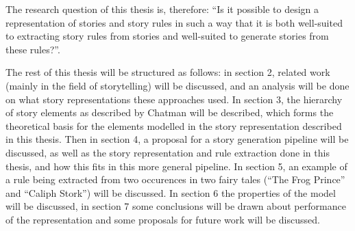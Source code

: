 The research question of this thesis is, therefore: ``Is it possible to design a
representation of stories and story rules in such a way that it is both 
well-suited to extracting story rules from stories and well-suited to generate 
stories from these rules?''.

The rest of this thesis will be structured as follows: in section 2, related
work (mainly in the field of storytelling) will be discussed, and an analysis
will be done on what story representations these approaches used. In section 3,
the hierarchy of story elements as described by Chatman will be described, which
forms the theoretical basis for the elements modelled in the story
representation described in this thesis. Then in
section 4, a proposal for a story generation pipeline will be discussed, as well
as the story representation and rule extraction done in this thesis, and how
this fits in this more general pipeline. In section 5, an example of a rule
being extracted from two occurences in two fairy tales (``The Frog Prince'' and
``Caliph Stork'') will be discussed. In section 6 the properties of the model
will be discussed, in section 7 some conclusions will be 
drawn about performance of the representation and some proposals 
for future work will be discussed.
